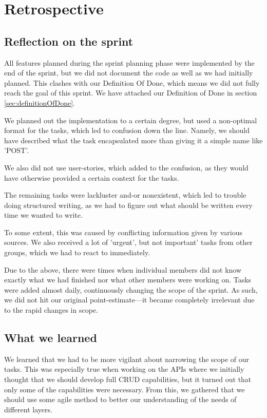 \section{Retrospective}

\subsection{Reflection on the sprint}
All features planned during the sprint planning phase were implemented by the end of the sprint, but we did not document the code as well as we had initially planned. 
This clashes with our Definition Of Done, which means we did not fully reach the goal of this sprint. We have attached our Definition of Done in section \ref{sec:definitionOfDone}.

We planned out the implementation to a certain degree, but used a non-optimal format for the tasks, which led to confusion down the line. Namely, we should have described what the task encapsulated more than giving it a simple name like 'POST'. 

We also did not use user-stories, which added to the confusion, as they would have otherwise provided a certain context for the tasks.

The remaining tasks were lackluster and-or nonexistent, which led to trouble doing structured writing, as we had to figure out what should be written every time we wanted to write.
    
To some extent, this was caused by conflicting information given by various sources. We also received a lot of 'urgent', but not important' tasks from other groups, which we had to react to immediately.
    
Due to the above, there were times when individual members did not know exactly what we had finished nor what other members were working on. Tasks were added almost daily, continuously changing the scope of the sprint.
As such, we did not hit our original point-estimate---it became completely irrelevant due to the rapid changes in scope.

\subsection{What we learned}\label{Whatwelearnedsprint3}
We learned that we had to be more vigilant about narrowing the scope of our tasks. 
This was especially true when working on the APIs where we initially thought that we should develop full CRUD capabilities, but it turned out that only some of the capabilities were necessary. 
From this, we gathered that we should use some agile method to better our understanding of the needs of different layers.

